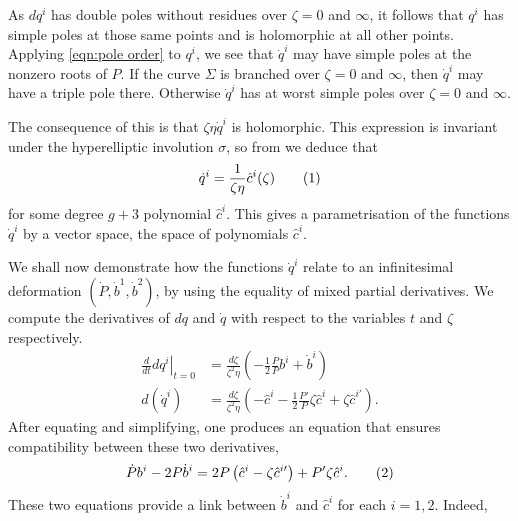 \documentclass{article}
\begin{document}
As $dq^i$ has double poles without residues over $\zeta=0$ and $\infty$, it follows that $q^i$ has simple poles at those same points and is holomorphic at all other points. Applying \eqref{eqn:pole order} to $q^i$, we see that $\dot{q}^i$ may have simple poles at the nonzero roots of $P$. If the curve $\Sigma$ is branched over $\zeta=0$ and $\infty$, then $\dot{q}^i$ may have a triple pole there. Otherwise $\dot{q}^i$ has at worst simple poles over $\zeta=0$ and $\infty$.

The consequence of this is that $\zeta\eta\dot{q}^i$ is holomorphic. This expression is invariant under the hyperelliptic involution $\sigma$, so from \cite[Prop~III.1.10]{Miranda1995} we deduce that
\[
\dot{q}^i = \frac{1}{\zeta\eta}\hat{c}^i(\zeta)
\labelthis{eqn:def q dot}
\]
for some degree $g+3$ polynomial $\hat{c}^i$. This gives a parametrisation of the functions $\dot{q}^i$ by a vector space, the space of polynomials $\hat{c}^i$.

We shall now demonstrate how the functions $\dot{q}^i$ relate to an infinitesimal deformation $(\dot{P},\dot{b}^1,\dot{b}^2)$, by using the equality of mixed partial derivatives. We compute the derivatives of $dq$ and $\dot{q}$ with respect to the variables $t$ and $\zeta$ respectively.
\begin{align*}
\left . \frac{d}{dt} dq^i \right|_{t=0} &= \frac{d\zeta}{\zeta^2 \eta}\left( -\frac{1}{2}\frac{\dot P}{P}b^i + \dot{b}^i \right) \\
d(\dot{q}^i) & = \frac{d\zeta}{\zeta^2\eta}\left( -\hat{c}^i -\frac{1}{2}\frac{P'}{P}\zeta\hat{c}^i + \zeta\hat{c}^{i\prime}\right).
\end{align*}
After equating and simplifying, one produces an equation that ensures compatibility between these two derivatives,
\[
\dot{P} b^i - 2P\dot{b}^i = 2P\left( \hat{c}^i - \zeta\hat{c}^{i\prime} \right) + P'\zeta\hat{c}^i. \labelthis{eqn:EMPDi}
\]
These two equations provide a link between $\dot{b}^i$ and $\hat{c}^i$ for each $i=1,2$. Indeed,
\end{document}
